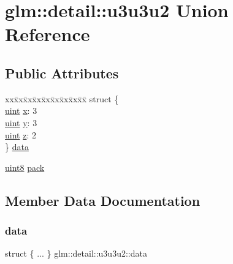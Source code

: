 \hypertarget{unionglm_1_1detail_1_1u3u3u2}{}\section{glm\+:\+:detail\+:\+:u3u3u2 Union Reference}
\label{unionglm_1_1detail_1_1u3u3u2}
\subsection*{Public Attributes}
\begin{DoxyCompactItemize}
\item 
\begin{tabbing}
xx\=xx\=xx\=xx\=xx\=xx\=xx\=xx\=xx\=\kill
struct \{\\
\>\hyperlink{group__core__precision_ga4fd29415871152bfb5abd588334147c8}{uint} \hyperlink{unionglm_1_1detail_1_1u3u3u2_aaa6af1d1bd34a7e72c0d7b1bb622a4da}{x}: 3\\
\>\hyperlink{group__core__precision_ga4fd29415871152bfb5abd588334147c8}{uint} \hyperlink{unionglm_1_1detail_1_1u3u3u2_a2139299d7ae9d48a986ddd3edff8d669}{y}: 3\\
\>\hyperlink{group__core__precision_ga4fd29415871152bfb5abd588334147c8}{uint} \hyperlink{unionglm_1_1detail_1_1u3u3u2_a53e88031a04c880792dd6e36f8e96f9a}{z}: 2\\
\} \hyperlink{unionglm_1_1detail_1_1u3u3u2_a57d54b9b29a5b2cae7b37e6428bd888b}{data}\\

\end{tabbing}\item 
\hyperlink{namespaceglm_1_1detail_aef2588f97d090cc19fbbe0c74fe17c8f}{uint8} \hyperlink{unionglm_1_1detail_1_1u3u3u2_aea48c2c7d1d3283f3c785daa33551351}{pack}
\end{DoxyCompactItemize}


\subsection{Member Data Documentation}
\mbox{\label{unionglm_1_1detail_1_1u3u3u2_a57d54b9b29a5b2cae7b37e6428bd888b}} 
\subsubsection{\texorpdfstring{data}{data}}
{\footnotesize\ttfamily struct \{ ... \}   glm\+::detail\+::u3u3u2\+::data}


